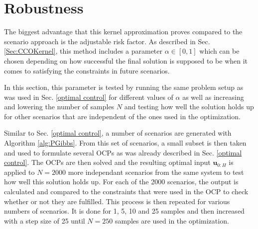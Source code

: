 \section{Robustness} \label{performance guarantees}

The biggest advantage that this kernel approximation proves compared to the scenario approach is the adjustable risk factor. As described in Sec. \ref{Sec:CCOKernel}, this method includes a parameter $\alpha \in [0, 1]$ which can be chosen depending on how successful the final solution is supposed to be when it comes to satisfying the constraints in future scenarios. 

In this section, this parameter is tested by running the same problem setup as was used in Sec. \ref{optimal control} for different values of $\alpha$ as well as increasing and lowering the number of samples $N$ and testing how well the solution holds up for other scenarios that are independent of the ones used in the optimization.

Similar to Sec. \ref{optimal control}, a number of scenarios are generated with Algorithm \ref{alg:PGibbs}. From this set of scenarios, a small subset is then taken and used to formulate several OCPs as was already described in Sec. \ref{optimal control}. The OCPs are then solved and the resulting optimal input $\boldsymbol{u}_{0:H}$ is applied to $N = 2000$ more independant scenarios from the same system to test how well this solution holds up. For each of the 2000 scenarios, the output is calculated and compared to the constraints that were used in the OCP to check whether or not they are fulfilled. This process is then repeated for various numbers of scenarios. It is done for 1, 5, 10 and 25 samples and then increased with a step size of 25 until $N = 250$ samples are used in the optimization.

